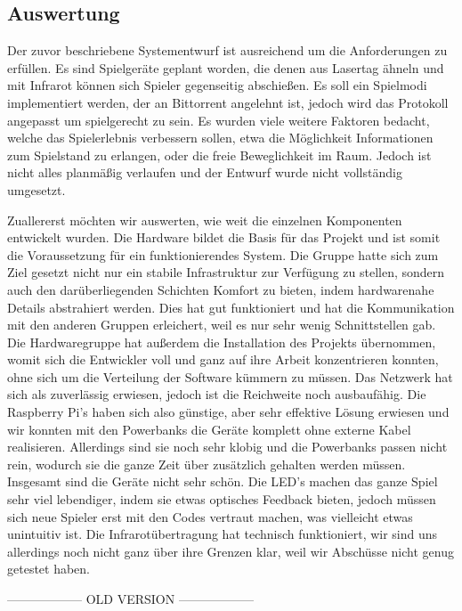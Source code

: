 \subsection{Auswertung}
\label{sec:auswertung}

Der zuvor beschriebene Systementwurf ist ausreichend um die Anforderungen zu
erfüllen. Es sind Spielgeräte geplant worden, die denen aus Lasertag ähneln
und mit Infrarot können sich Spieler gegenseitig abschießen. Es soll ein
Spielmodi implementiert werden, der an Bittorrent angelehnt ist, jedoch
wird das Protokoll angepasst um spielgerecht zu sein. Es wurden viele weitere
Faktoren bedacht, welche das Spielerlebnis verbessern sollen, etwa die
Möglichkeit Informationen zum Spielstand zu erlangen, oder die freie
Beweglichkeit im Raum. Jedoch ist nicht alles planmäßig verlaufen und der
Entwurf wurde nicht vollständig umgesetzt.

Zuallererst möchten wir auswerten, wie weit die einzelnen Komponenten
entwickelt wurden. Die Hardware bildet die Basis für das Projekt und ist somit
die Voraussetzung für ein funktionierendes System. Die Gruppe hatte sich zum
Ziel gesetzt nicht nur ein stabile Infrastruktur zur Verfügung zu stellen,
sondern auch den darüberliegenden Schichten Komfort zu bieten, indem
hardwarenahe Details abstrahiert werden. Dies hat gut funktioniert und hat die
Kommunikation mit den anderen Gruppen erleichert, weil es nur sehr wenig
Schnittstellen gab. Die Hardwaregruppe hat außerdem die Installation des 
Projekts übernommen, womit sich die Entwickler voll und ganz auf ihre Arbeit
konzentrieren konnten, ohne sich um die Verteilung der Software kümmern zu
müssen. Das Netzwerk hat sich als zuverlässig erwiesen, jedoch ist die
Reichweite noch ausbaufähig. Die Raspberry Pi's haben sich also günstige, aber
sehr effektive Lösung erwiesen und wir konnten mit den Powerbanks die
Geräte komplett ohne externe Kabel realisieren. Allerdings sind sie noch sehr
klobig und die Powerbanks passen nicht rein, wodurch sie die ganze Zeit über
zusätzlich gehalten werden müssen. Insgesamt sind die Geräte nicht sehr schön.
Die LED's machen das ganze Spiel sehr viel lebendiger, indem sie etwas
optisches Feedback bieten, jedoch müssen sich neue Spieler erst mit den Codes
vertraut machen, was vielleicht etwas unintuitiv ist. Die Infrarotübertragung
hat technisch funktioniert, wir sind uns allerdings noch nicht ganz über ihre
Grenzen klar, weil wir Abschüsse nicht genug getestet haben.

------------------ OLD VERSION ------------------



